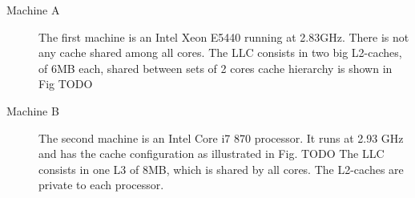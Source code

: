 \begin{figure}[htbp]
 \centering%
  \qquad\qquad
 \caption{}
\end{figure}

\begin{description}
\item[Machine A] The first machine is an Intel Xeon E5440 running at 2.83GHz. There is not any cache shared among all cores. The LLC consists in two 
big L2-caches, of 6MB each, shared between sets of 2 cores cache hierarchy is shown in Fig TODO

\item[Machine B] The second machine is an Intel Core i7 870 processor. It runs at 2.93 GHz and has the cache configuration as illustrated in Fig. TODO
The LLC consists in one L3 of 8MB, which is shared by all cores. The L2-caches are private to each processor. 

\end{description}

